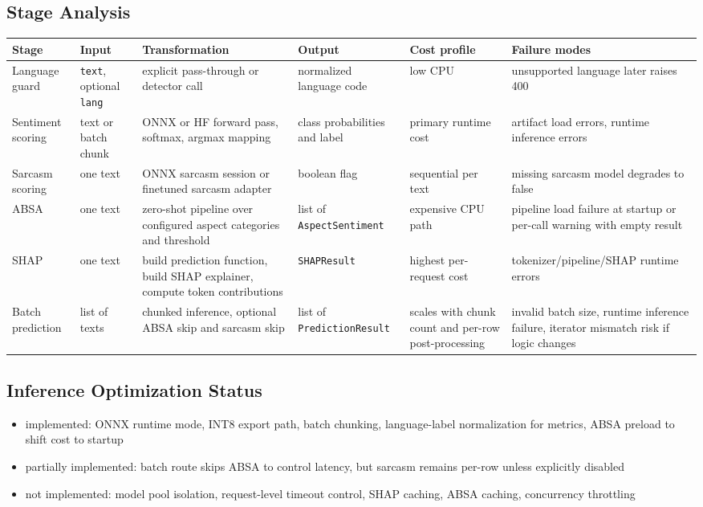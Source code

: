 \subsection{Stage Analysis}
\begin{longtable}{@{}p{}p{}p{}p{}p{}p{}@{}}
\toprule
\textbf{Stage} & \textbf{Input} & \textbf{Transformation} & \textbf{Output} & \textbf{Cost profile} & \textbf{Failure modes} \\
\midrule
\endhead
Language guard & \texttt{text}, optional \texttt{lang} & explicit pass-through or detector call & normalized language code & low CPU & unsupported language later raises 400 \\
Sentiment scoring & text or batch chunk & ONNX or HF forward pass, softmax, argmax mapping & class probabilities and label & primary runtime cost & artifact load errors, runtime inference errors \\
Sarcasm scoring & one text & ONNX sarcasm session or finetuned sarcasm adapter & boolean flag & sequential per text & missing sarcasm model degrades to false \\
ABSA & one text & zero-shot pipeline over configured aspect categories and threshold & list of \texttt{AspectSentiment} & expensive CPU path & pipeline load failure at startup or per-call warning with empty result \\
SHAP & one text & build prediction function, build SHAP explainer, compute token contributions & \texttt{SHAPResult} & highest per-request cost & tokenizer/pipeline/SHAP runtime errors \\
Batch prediction & list of texts & chunked inference, optional ABSA skip and sarcasm skip & list of \texttt{PredictionResult} & scales with chunk count and per-row post-processing & invalid batch size, runtime inference failure, iterator mismatch risk if logic changes \\
\bottomrule
\end{longtable}

\subsection{Inference Optimization Status}
\begin{itemize}[leftmargin=1.2em]
  \item implemented: ONNX runtime mode, INT8 export path, batch chunking, language-label normalization for metrics, ABSA preload to shift cost to startup
  \item partially implemented: batch route skips ABSA to control latency, but sarcasm remains per-row unless explicitly disabled
  \item not implemented: model pool isolation, request-level timeout control, SHAP caching, ABSA caching, concurrency throttling
\end{itemize}

